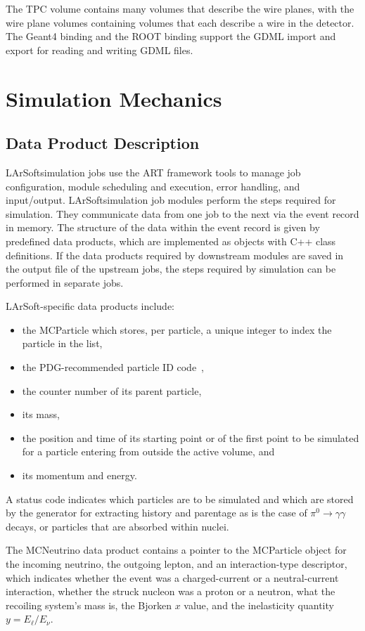 \documentclass[12pt]{elsarticle}
\newcommand{\larsoft}{LArSoft}
\begin{document}
The TPC volume contains many volumes that describe the wire planes, with the wire plane volumes containing volumes that each describe a wire in the detector. The Geant4 binding and the ROOT binding support the GDML import and export for reading and writing GDML files.
                    
\section{Simulation Mechanics}

\subsection{Data Product Description}

\larsoft simulation jobs use the ART framework tools to manage job configuration, module scheduling and execution, error handling, and input/output. \larsoft simulation job modules perform the steps required for simulation. They communicate data from one job to the next via the event record in memory. The structure of the data within the event record is given by predefined data products, which are implemented as objects with C++ class definitions. If the data products required by downstream modules are saved in the output file of the upstream jobs, the steps required by simulation can be performed in separate jobs.

\larsoft-specific data products include:
\begin{itemize}

\item{the MCParticle which stores, per particle, a unique integer to index the particle in the list,}
\item{the PDG-recommended particle ID code~\cite{pdgcode}, }
\item{the counter number of its parent particle,}
\item{its mass,}
\item{the position and time of its starting point or of the first point to be simulated
for a particle entering from outside the active volume, and}
\item{its momentum and energy.}
\end{itemize}
A status code indicates which particles are to be simulated and which
are stored by the generator for extracting history and parentage as is the
case of $\pi^0\rightarrow\gamma\gamma$ decays, or particles that are absorbed within
nuclei.

The MCNeutrino data product contains a pointer to the MCParticle object for
the incoming neutrino, the outgoing lepton, and an interaction-type descriptor,
which indicates whether the event was a charged-current or a neutral-current interaction,
whether the struck nucleon was a proton or a neutron, what the recoiling system's mass is,
the Bjorken $x$ value, and the inelasticity quantity $y=E_\ell/E_\nu$.
\end{document}
